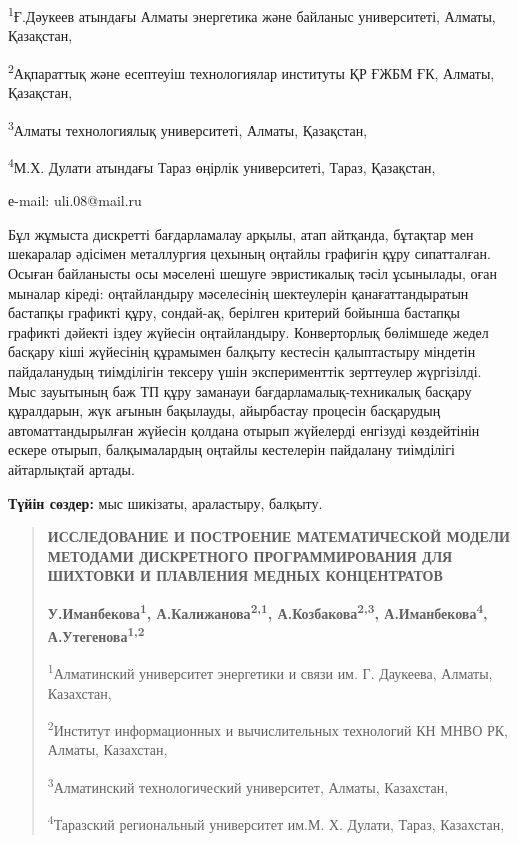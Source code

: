 \textsuperscript{1}Ғ.Дәукеев атындағы Алматы энергетика және байланыс
университеті, Алматы, Қазақстан,

\textsuperscript{2}Ақпараттық және есептеуіш технологиялар институты ҚР
ҒЖБМ ҒК, Алматы, Қазақстан,

\textsuperscript{3}Алматы технологиялық университеті, Алматы, Қазақстан,

\textsuperscript{4}М.Х. Дулати атындағы Тараз өңірлік университеті,
Тараз, Қазақстан,

е-mail: uli.08@mail.ru

Бұл жұмыста дискретті бағдарламалау арқылы, атап айтқанда, бұтақтар мен
шекаралар әдісімен металлургия цехының оңтайлы графигін құру
сипатталған. Осыған байланысты осы мәселені шешуге эвристикалық тәсіл
ұсынылады, оған мыналар кіреді: оңтайландыру мәселесінің шектеулерін
қанағаттандыратын бастапқы графикті құру, сондай-ақ, берілген критерий
бойынша бастапқы графикті дәйекті іздеу жүйесін оңтайландыру.
Конверторлық бөлімшеде жедел басқару кіші жүйесінің құрамымен балқыту
кестесін қалыптастыру міндетін пайдаланудың тиімділігін тексеру үшін
эксперименттік зерттеулер жүргізілді. Мыс зауытының баж ТП құру заманауи
бағдарламалық-техникалық басқару құралдарын, жүк ағынын бақылауды,
айырбастау процесін басқарудың автоматтандырылған жүйесін қолдана отырып
жүйелерді енгізуді көздейтінін ескере отырып, балқымалардың оңтайлы
кестелерін пайдалану тиімділігі айтарлықтай артады.

{\bfseries Түйін сөздер:} мыс шикізаты, араластыру, балқыту.

\begin{quote}
{\bfseries ИССЛЕДОВАНИЕ И ПОСТРОЕНИЕ МАТЕМАТИЧЕСКОЙ МОДЕЛИ МЕТОДАМИ
ДИСКРЕТНОГО ПРОГРАММИРОВАНИЯ ДЛЯ ШИХТОВКИ И ПЛАВЛЕНИЯ МЕДНЫХ
КОНЦЕНТРАТОВ}

{\bfseries У.Иманбекова\textsuperscript{1},
А.Калижанова\textsuperscript{2,1}, А.Козбакова\textsuperscript{2,3},
А.Иманбекова\textsuperscript{4}, А.Утегенова\textsuperscript{1,2}}

\textsuperscript{1}Алматинский университет энергетики и связи им. Г.
Даукеева, Алматы, Казахстан,

\textsuperscript{2}Институт информационных и вычислительных технологий
КН МНВО РК, Алматы, Казахстан,

\textsuperscript{3}Алматинский технологический университет, Алматы,
Казахстан,

\textsuperscript{4}Таразский региональный университет им.М. Х. Дулати,
Тараз, Казахстан,
\end{quote}

